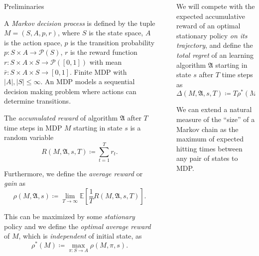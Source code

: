 \documentclass[final]{beamer}
\newcommand{\Exp}{\mathbb{E}}
\newlength{\sepwidth}
\newlength{\colwidth}
\newcommand{\separatorcolumn}{\begin{column}{\sepwidth}\end{column}}
\begin{document}
\begin{frame}[t]
\begin{columns}[t]
\begin{column}{\colwidth}
  \begin{block}{Preliminaries}
    
    A \textit{Markov decision process} is defined by the tuple $M = (S, A, p, r)$, where $S$ is the state space, $A$ is the action space, $p$ is the transition probability $p : S\times A \rightarrow \mathcal{P}(S)$, $r$ is the reward function $r : S \times A \times S \rightarrow \mathcal{P}([0, 1])$ with mean $\bar{r} : S \times A \times S \rightarrow [0, 1]$. Finite MDP with $|A|, |S| \leq \infty$. An MDP models a sequential decision making problem where actions can determine transitions.
  
    The \textit{accumulated reward} of algorithm $\mathfrak{A}$ after $T$ time steps in MDP $M$ starting in state $s$ is a random variable 
    $$ R(M, \mathfrak{A}, s, T) \coloneqq \sum_{t=1}^T r_t. $$
  
    Furthermore, we define the \textit{average reward} or \textit{gain} as 
    \begin{equation*}
      \rho(M, \mathfrak{A}, s) \coloneqq \lim_{T \rightarrow \infty} \Exp \left[ \frac{1}{T} R(M, \mathfrak{A}, s, T) \right].
    \end{equation*}
    
    This can be maximized by some \textit{stationary} policy and we define the \textit{optimal average reward} of $M$, which is \textit{independent} of initial state, as 
    $$ \rho^*(M) \coloneqq \max_{\pi : S \rightarrow A} \rho(M, \pi, s). $$
    
  \end{block}

\end{column}

\separatorcolumn

\begin{column}{\colwidth}

  We will compete with the expected accumulative reward of an optimal stationary policy \textit{on its trajectory}, and define the \textit{total regret} of an learning algorithm $\mathfrak{A}$ starting in state $s$ after $T$ time steps as
  $$ \Delta(M, \mathfrak{A}, s, T) \coloneqq T \rho^*(M) - R(M, \mathfrak{A}, s, T). $$
 
  We can extend a natural measure of the ``size'' of a Markov chain as the maximum of expected hitting times between any pair of states to MDP.
  

\end{column}
\end{columns}
\end{frame}
\end{document}
